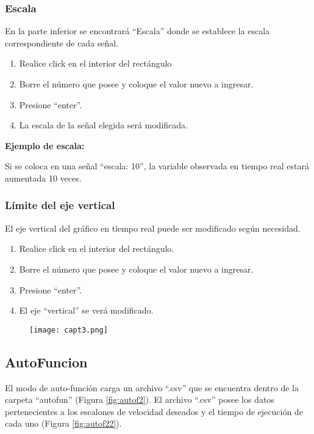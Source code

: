 \subsubsection{Escala}
En la parte inferior se encontrará “Escala” donde se establece la escala correspondiente de cada señal.
\begin{enumerate}
	\item Realice click en el interior del rectángulo
	\item Borre el número que posee y coloque el valor nuevo a ingresar.
	\item Presione “enter”.
	\item La escala de la señal elegida será modificada.
	
\end{enumerate}

\textbf{Ejemplo de escala:}

Si se coloca en una señal “escala: 10”, la variable observada en tiempo real estará aumentada 10 veces.

\subsubsection{Límite del eje vertical}
El eje vertical del gráfico en tiempo real puede ser modificado según necesidad.

\begin{enumerate}
	\item Realice click en el interior del rectángulo.
	\item Borre el número que posee y coloque el valor nuevo a ingresar.
	\item Presione “enter”.
	\item El eje “vertical” se verá modificado.
	
\end{enumerate}


\begin{figure}[H]
	\centering
	\texttt{[image: capt3.png]}
	\label{fig:capt3}
\end{figure}

\subsection{AutoFuncion}
El modo de auto-función carga un archivo “.csv” que se encuentra dentro de la carpeta “autofun” (Figura \ref{fig:autof2}). El archivo “.csv” posee los datos pertenecientes a los escalones de velocidad deseados y el tiempo de ejecución de cada uno (Figura \ref{fig:autof22}).

